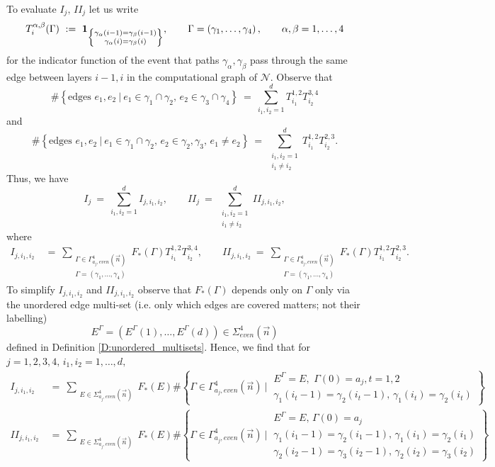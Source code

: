 \documentclass[11pt, reqno]{amsart}
\newcommand{\lr}[1]{\ensuremath{\left(#1 \right)}}
\newcommand{\mN}{\mathcal N}
\begin{document}
To evaluate $I_{j},\, II_{j}$ let us write
\begin{equation}\label{E:T-def}
T_{i}^{\alpha,\beta}(\Gamma)~:=~{\bf 1}_{\left\{\substack{\gamma_\alpha(i-1)=\gamma_\beta(i-1)\\\gamma_\alpha(i)=\gamma_\beta(i)}\right\}},\qquad \Gamma = \lr{\gamma_1,\ldots, \gamma_4},\qquad \alpha,\beta=1,\ldots,4
\end{equation}
for the indicator function of the event that paths $\gamma_\alpha,\gamma_\beta$ pass through the same edge between layers $i-1,i$ in the computational graph of $\mN$. Observe that
\[\#\left\{\text{edges }e_1,e_2~|~e_1\in \gamma_1\cap \gamma_2,\,e_2\in \gamma_3\cap \gamma_4\right\}~=~\sum_{i_1,i_2=1}^d T_{i_1}^{1,2}T_{i_2}^{3,4}\]
and
\[\#\left\{\text{edges }e_1,e_2~|~e_1\in \gamma_1\cap \gamma_2,\,e_2\in \gamma_2, \gamma_3,\,e_1\neq e_2\right\}~=~\sum_{\substack{i_1,i_2=1\\ i_1\neq i_2}}^d T_{i_1}^{1,2}T_{i_2}^{2,3}.\]
Thus, we have
\[I_{j}~=~\sum_{i_1,i_2=1}^d I_{j,i_1,i_2},\qquad II_{j}~=~\sum_{\substack{i_1,i_2=1\\i_1\neq i_2}}^d II_{j,i_1,i_2},\]
where
\begin{align*}
  I_{j,i_1,i_2}~&=~\sum_{\substack{\Gamma\in \Gamma_{a_j, even}^4\lr{\vec{n}}\\\Gamma=\lr{\gamma_1,\ldots, \gamma_4}}} F_*(\Gamma) T_{i_1}^{1,2}T_{i_2}^{3,4},\qquad  II_{j,i_1,i_2}~=~\sum_{\substack{\Gamma\in \Gamma_{a_j, even}^4\lr{\vec{n}}\\\Gamma=\lr{\gamma_1,\ldots, \gamma_4}}} F_*(\Gamma) T_{i_1}^{1,2}T_{i_2}^{2,3}.
\end{align*}
To simplify $I_{j,i_1,i_2}$ and $II_{j,i_1,i_2}$ observe that $F_*(\Gamma)$ depends only on $\Gamma$ only via  the unordered edge multi-set (i.e. only which edges are covered matters; not their labelling)
\[E^\Gamma=\lr{E^\Gamma(1),\ldots, E^\Gamma(d)}\in \Sigma_{even}^4\lr{\vec{n}}\]
defined in Definition \ref{D:unordered_multisets}. Hence, we find that for $j=1,2,3,4,\,i_1,i_2=1,\ldots, d,$ 
\begin{align}
\label{E:I-star-2}I_{j,i_1,i_2}~& =~\sum_{\substack{E\in \Sigma_{a_j, even}^4(\vec{n})}} F_*(E)\#\left\{\Gamma\in \Gamma_{a_j, even}^4(\vec{n})~\big|~\substack{E^\Gamma=E,\,\,\Gamma(0)=a_j,t=1,2\\\gamma_1(i_t-1)=\gamma_2(i_t-1),\, \gamma_1(i_t)=\gamma_2(i_t)}\right\}\\
\label{E:II-star-2}II_{j,i_1,i_2}~& =~\sum_{\substack{E\in \Sigma_{a_j, even}^4(\vec{n})}} F_*(E)\#\left\{\Gamma\in \Gamma_{a_j, even}^4(\vec{n})~\bigg|~\substack{E^\Gamma=E,\,\Gamma(0)=a_j\\\gamma_1(i_1-1)=\gamma_2(i_1-1),\, \gamma_1(i_1)=\gamma_2(i_1)\\\gamma_2(i_2-1)=\gamma_3(i_2-1),\,\gamma_2(i_2)=\gamma_3(i_2)}\right\}
\end{align}
\end{document}

